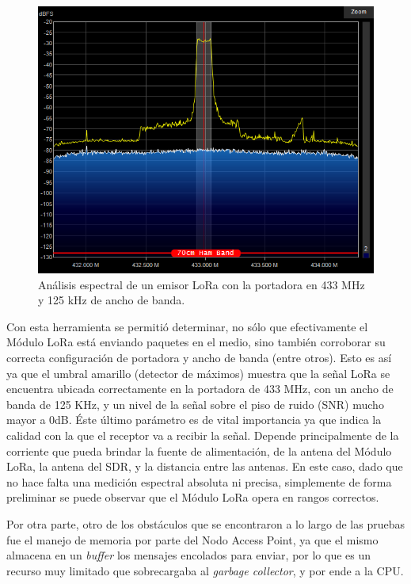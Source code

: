 \begin{figure}[H]
    \centering
    \includegraphics[width=1\linewidth]{Figures/Firmware/espectro.png}
    \caption{Análisis espectral de un emisor LoRa con la portadora en 433 MHz y 125 kHz de ancho de banda.}
    \label{fig:pruebas_firmware_1}
\end{figure}

Con esta herramienta se permitió determinar, no sólo que efectivamente el Módulo LoRa está enviando paquetes en el medio, sino también corroborar su correcta configuración de portadora y ancho de banda (entre otros). Esto es así ya que el umbral amarillo (detector de máximos) muestra que la señal LoRa se encuentra ubicada correctamente en la portadora de 433 MHz, con un ancho de banda de 125 KHz, y un nivel de la señal sobre el piso de ruido (SNR) mucho mayor a 0dB. Éste último parámetro es de vital importancia ya que indica la calidad con la que el receptor va a recibir la señal. Depende principalmente de la corriente que pueda brindar la fuente de alimentación, de la antena del Módulo LoRa, la antena del SDR, y la distancia entre las antenas. En este caso, dado que no hace falta una medición espectral absoluta ni precisa, simplemente de forma preliminar se puede observar que el Módulo LoRa opera en rangos correctos.

Por otra parte, otro de los obstáculos que se encontraron a lo largo de las pruebas fue el manejo de memoria por parte del Nodo Access Point, ya que el mismo almacena en un \textit{buffer} los mensajes encolados para enviar, por lo que es un recurso muy limitado que sobrecargaba al \textit{garbage collector}, y por ende a la CPU.

